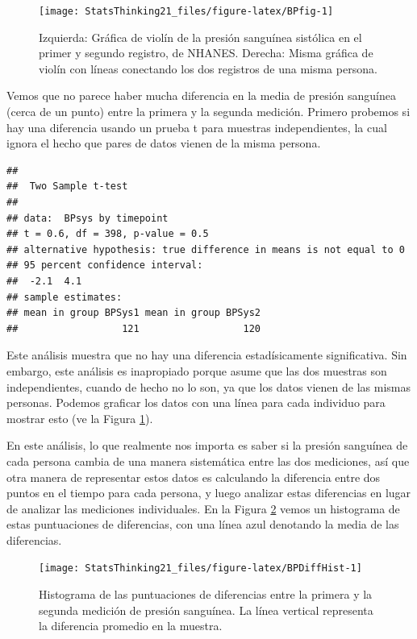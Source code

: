 \documentclass[
  12pt,
]{book}
\begin{document}
\begin{figure}
\texttt{[image: StatsThinking21\_files/figure-latex/BPfig-1]} \caption{Izquierda: Gráfica de violín de la presión sanguínea sistólica en el primer y segundo registro, de NHANES. Derecha: Misma gráfica de violín con líneas conectando los dos registros de una misma persona.}\label{fig:BPfig}
\end{figure}

Vemos que no parece haber mucha diferencia en la media de presión sanguínea (cerca de un punto) entre la primera y la segunda medición. Primero probemos si hay una diferencia usando un prueba t para muestras independientes, la cual ignora el hecho que pares de datos vienen de la misma persona.

\begin{verbatim}
## 
## 	Two Sample t-test
## 
## data:  BPsys by timepoint
## t = 0.6, df = 398, p-value = 0.5
## alternative hypothesis: true difference in means is not equal to 0
## 95 percent confidence interval:
##  -2.1  4.1
## sample estimates:
## mean in group BPSys1 mean in group BPSys2 
##                  121                  120
\end{verbatim}

Este análisis muestra que no hay una diferencia estadísicamente significativa. Sin embargo, este análisis es inapropiado porque asume que las dos muestras son independientes, cuando de hecho no lo son, ya que los datos vienen de las mismas personas. Podemos graficar los datos con una línea para cada individuo para mostrar esto (ve la Figura \ref{fig:BPfig}).

En este análisis, lo que realmente nos importa es saber si la presión sanguínea de cada persona cambia de una manera sistemática entre las dos mediciones, así que otra manera de representar estos datos es calculando la diferencia entre dos puntos en el tiempo para cada persona, y luego analizar estas diferencias en lugar de analizar las mediciones individuales. En la Figura \ref{fig:BPDiffHist} vemos un histograma de estas puntuaciones de diferencias, con una línea azul denotando la media de las diferencias.

\begin{figure}
\texttt{[image: StatsThinking21\_files/figure-latex/BPDiffHist-1]} \caption{Histograma de las puntuaciones de diferencias entre la primera y la segunda medición de presión sanguínea. La línea vertical representa la diferencia promedio en la muestra.}\label{fig:BPDiffHist}
\end{figure}
\end{document}
